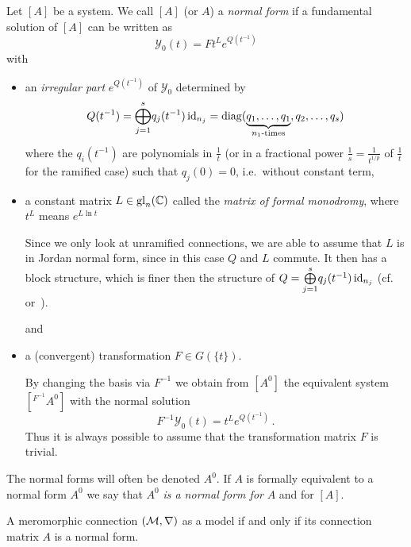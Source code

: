 \begin{defn}\label{defn:normSol}
  Let $[A]$ be a system.
  We call $[A]$ (or $A$) a \emph{normal form} if a fundamental solution of
  $[A]$ can be written as
  \[
    \mathcal{Y}_0(t)=F t^L e^{Q(t^{-1})}
  \]
  with
  \begin{itemize}
    \item an \emph{irregular part} $e^{Q(t^{-1})}$ of $\mathcal{Y}_0$
      determined by
      \[
        Q(t^{-1})=\underset{j=1}{\overset{s}{\bigoplus}}q_j(t^{-1})\id_{n_j}
          =\diag(\underset{n_1\text{-times}}{\underbrace{%
          q_1,\dots,q_1}},q_2,\dots,q_s)
      \]
      where the $q_i(t^{-1})$ are polynomials in $\frac{1}{t}$ (or in a
      fractional power $\frac{1}{s}=\frac{1}{t^{1/p}}$ of $\frac{1}{t}$ for the
      ramified case) such that $q_j(0)=0$, i.e.\ without constant term,
    \item a constant matrix $L\in\operatorname{gl}_n(\mathbb{C})$ called the \emph{matrix of formal
      monodromy}, where $t^L$ means $e^{L\ln t}$
        \begin{s-rem}
          Since we only look at unramified connections, we are able to assume
          that $L$ is in Jordan normal form, since in this case $Q$ and $L$
          commute. It then has a block structure, which is finer then the
          structure of
          $Q=\underset{j=1}{\overset{s}{\bigoplus}}q_j(t^{-1})\operatorname{id}_{n_j}$
          (cf.~\cite[Sec.1]{Remy2014} or~\cite[Sec.4]{Martinet1991}).
          \PROBLEM[Why?]
        \end{s-rem}
      and
    \item a (convergent) transformation $F\in G(\!\{t\}\!)$.
      \begin{s-rem}
        By changing the basis via $F^{-1}$ we obtain from $[A^0]$ the
        equivalent system $[{}^{F^{-1}}\!A^0]$ with the normal solution
        \[
          F^{-1}\mathcal{Y}_0(t)=t^L e^{Q(t^{-1})} \,.
        \]
        Thus it is always possible to assume that the transformation matrix $F$
        is trivial.
      \end{s-rem}
  \end{itemize}
  The normal forms will often be denoted $A^0$.
  If $A$ is formally equivalent to a normal form $A^0$ we say that $A^0$
  \emph{is a normal form for} $A$ and for $[A]$.
\end{defn}
\begin{cor}
  A meromorphic connection $(\mathcal{M},\nabla)$ as a model if and only if its
  connection matrix $A$ is a normal form.
\end{cor}

